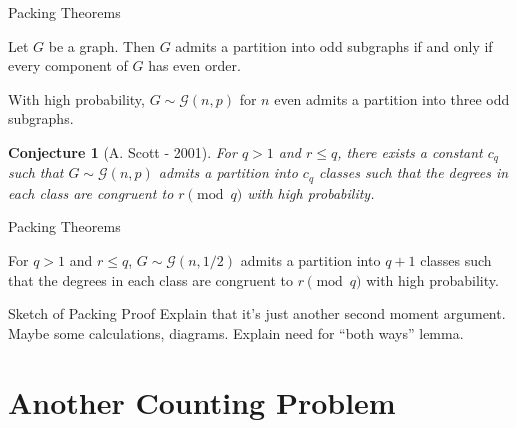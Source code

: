 \documentclass{beamer}
\theoremstyle{plain}
\newtheorem{conjecture}[theorem]{Conjecture}
\begin{document}
	\begin{frame}{Packing Theorems}
		\begin{theorem}[A. Scott - 2001]
			Let $G$ be a graph. Then $G$ admits a partition into odd subgraphs if and only if every component of $G$ has even order.
		\end{theorem}

		\pause

		\begin{theorem}[A. Scott - 2001]
			With high probability, $G\sim \mathcal{G}(n, p)$ for $n$ even admits a partition into three odd subgraphs.
		\end{theorem}

		\pause

		\begin{conjecture}[A. Scott - 2001]
			For $q>1$ and $r \leq q$, there exists a constant $c_q$ such that $G\sim \mathcal{G}(n, p)$ admits a partition into $c_q$ classes such that the degrees in each class are congruent to $r\pmod q$ with high probability.
		\end{conjecture}
	\end{frame}


	\begin{frame}{Packing Theorems}
		\begin{theorem}
			For $q>1$ and $r\leq q$, $G\sim \mathcal{G}(n, 1/2)$ admits a partition into $q+1$ classes such that the degrees in each class are congruent to $r\pmod q$ with high probability.
		\end{theorem}
	\end{frame}


	\begin{frame}{Sketch of Packing Proof}
		Explain that it's just another second moment argument. Maybe some calculations, diagrams. Explain need for ``both ways'' lemma.
	\end{frame}


\section{Another Counting Problem}
\end{document}
